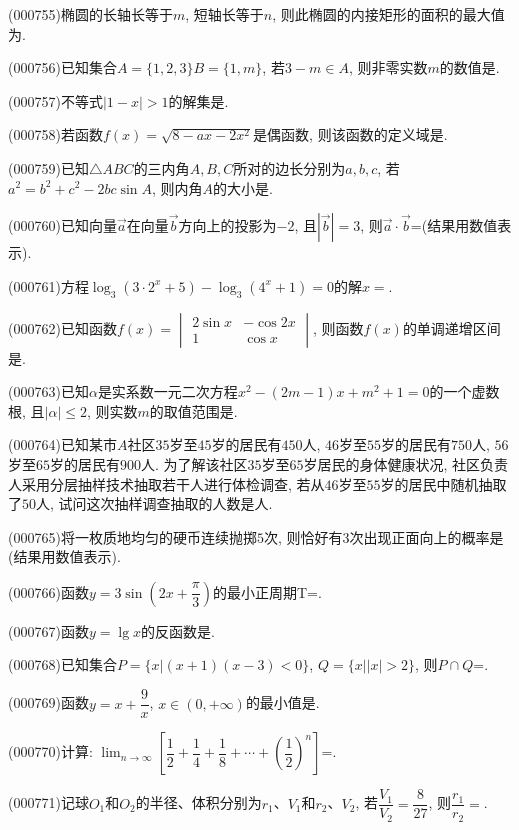 \item (000755)椭圆的长轴长等于$m$, 短轴长等于$n$, 则此椭圆的内接矩形的面积的最大值为.
\item (000756)已知集合$A=\{1,2,3\}B=\{1,m\}$, 若$3-m\in A$, 则非零实数$m$的数值是.
\item (000757)不等式$|1-x|>1$的解集是.
\item (000758)若函数$f(x)=\sqrt{8-ax-2x^2}$是偶函数, 则该函数的定义域是.
\item (000759)已知$\triangle ABC$的三内角$A,B,C$所对的边长分别为$a,b,c$, 若$a^2=b^2+c^2-2bc\sin A$, 则内角$A$的大小是.
\item (000760)已知向量$\overrightarrow a$在向量$\overrightarrow b$方向上的投影为$-2$, 且$|\overrightarrow b|=3$, 则$\overrightarrow a\cdot \overrightarrow b$=(结果用数值表示).
\item (000761)方程$\log_3(3 \cdot 2^x+5)-\log_3(4^x+1)=0$的解$x=$.
\item (000762)已知函数$f(x)=\begin{vmatrix}
2\sin x & -\cos 2x  \\ 1  & \cos x  \end{vmatrix}$, 则函数$f(x)$的单调递增区间是.
\item (000763)已知$\alpha$是实系数一元二次方程$x^2-(2m-1)x+m^2+1=0$的一个虚数根, 且$|\alpha|\le 2$, 则实数$m$的取值范围是.
\item (000764)已知某市$A$社区$35$岁至$45$岁的居民有$450$人, $46$岁至$55$岁的居民有$750$人, $56$岁至$65$岁的居民有$900$人. 为了解该社区$35$岁至$65$岁居民的身体健康状况, 社区负责人采用分层抽样技术抽取若干人进行体检调查, 若从$46$岁至$55$岁的居民中随机抽取了$50$人, 试问这次抽样调查抽取的人数是人.
\item (000765)将一枚质地均匀的硬币连续抛掷$5$次, 则恰好有$3$次出现正面向上的概率是(结果用数值表示).
\item (000766)函数$y=3\sin(2x+\dfrac{\pi}3)$的最小正周期T=.
\item (000767)函数$y=\lg x$的反函数是.
\item (000768)已知集合$P=\{x|(x+1)(x-3)<0\}$, $Q=\{x||x|>2\}$, 则$P\cap Q$=.
\item (000769)函数$y=x+\dfrac9x$, $x\in (0,+\infty)$的最小值是.
\item (000770)计算: $\displaystyle\lim_{n\to\infty}[\dfrac12+\dfrac14+\dfrac18+\cdots+(\dfrac12)^n]$=.
\item (000771)记球$O_1$和$O_2$的半径、体积分别为$r_1$、$V_1$和$r_2$、$V_2$, 若$\dfrac{V_1}{V_2}=\dfrac8{27}$, 则$\dfrac{r_1}{r_2}=$.
